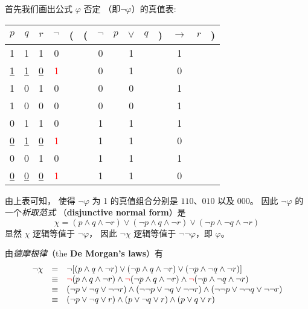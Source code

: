 \documentclass[UTF8,12pt,a4paper]{ctexart}
\begin{document}
首先我们画出公式 $\varphi$ {\color{red} 否定} （即$\neg\varphi$）的真值表:
\begin{center}
	\begin{tabular}{@{ }c@{ }@{ }c@{ }@{ }c | c@{ }@{}c@{}@{}c@{}@{ }c@{ }@{ }c@{ }@{ }c@{ }@{ }c@{ }@{}c@{}@{ }c@{ }@{ }c@{ }@{}c@{ }}
		$p$ & $q$ & $r$ & {\color{red} $\lnot$} & ( & ( & $\lnot$ & $p$ & $\lor$ & $q$ & ) & $\rightarrow$ & $r$ & )\\
		\hline 
		1 & 1 & 1 & 0 &  &  & 0 &  & 1 &  &  & 1 &  & \\
		\underline{1} & \underline{1} & \underline{0} & \textcolor{red}{1} &  &  & 0 &  & 1 &  &  & 0 &  & \\
		1 & 0 & 1 & 0 &  &  & 0 &  & 0 &  &  & 1 &  & \\
		1 & 0 & 0 & 0 &  &  & 0 &  & 0 &  &  & 1 &  & \\
		0 & 1 & 1 & 0 &  &  & 1 &  & 1 &  &  & 1 &  & \\
		\underline{0} & \underline{1} & \underline{0} & \textcolor{red}{1} &  &  & 1 &  & 1 &  &  & 0 &  & \\
		0 & 0 & 1 & 0 &  &  & 1 &  & 1 &  &  & 1 &  & \\
		\underline{0} & \underline{0} & \underline{0} & \textcolor{red}{1} &  &  & 1 &  & 1 &  &  & 0 &  & \\
	\end{tabular}
\end{center}

由上表可知，
使得 $\neg \varphi$ 为 1 的真值组合分别是
$110$、$010$ 以及 $000$。
因此  $\neg \varphi$ 的一个\textit{析取范式} 
（\textbf{disjunctive normal form}）是
\[
\chi = (p \land q \land \neg r) \lor (\neg p \land q \land \neg r) \lor (\neg p \land  \neg q \land \neg r)
\] 
显然 $\chi$ 逻辑等值于 $\neg \varphi$，
因此 $\neg \chi $ 逻辑等值于 $ \neg \neg \varphi$，即 $\varphi$。

由\textit{德摩根律}（the \textbf{De Morgan’s laws}）有
\[\begin{array}{l l l}
	\neg \chi 
	&=&   
	\neg [ (p \land q \land \neg r) \lor (\neg p \land q \land \neg r) \lor (\neg p \land  \neg q \land \neg r)  ] \\
	
	&\equiv&   
	{\color{red} \neg} (p \land q \land \neg r) \land {\color{red} \neg} (\neg p \land q \land \neg r) \land {\color{red} \neg} (\neg p \land  \neg q \land \neg r)  \\
	
	&\equiv&   
	( \neg p \lor \neg q \lor  \neg \neg r) \land  ( \neg \neg p \lor \neg q \lor \neg \neg r) \land  (\neg \neg p \lor \neg  \neg q \lor \neg \neg r)  \\
	
	&\equiv&   
	( \neg p \lor \neg q \lor  r) \land  ( p \lor \neg q \lor r) \land  ( p \lor  q \lor r)  \\
\end{array}\]
\end{document}
